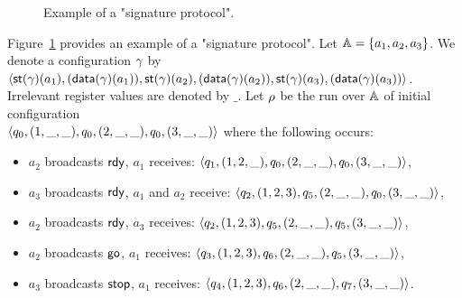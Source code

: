 \begin{figure}[t]
	\centering
	\resizebox*{!}{3.5cm}{
	
	}
	\caption{Example of a "signature protocol".}\label{fig:ex2}\label{fig:example-signature-protocol}
\end{figure}
\begin{example}
\label{ex:protocol-signature}
	Figure~\ref{fig:example-signature-protocol} provides an example of a "signature protocol".
Let $\mathbb{A} = \{a_1, a_2,a_3\}$. We denote a configuration $\gamma$ by $\langle \mathsf{st}(\gamma)(a_1),(\mathsf{data}(\gamma)(a_1)), \\ \mathsf{st}(\gamma)(a_2),(\mathsf{data}(\gamma)(a_2)), \mathsf{st}(\gamma)(a_3), (\mathsf{data}(\gamma)(a_3)) \rangle$. Irrelevant register values are denoted by $\_$. Let $\rho$ be the run over $\mathbb{A}$ of initial configuration  \\$\langle q_0, (1,\_,\_), q_0, (2,\_,\_), q_0, (3,\_,\_) \rangle$ where the following occurs:
\begin{itemize}
\item $a_2$ broadcasts $\textsf{rdy}$, $a_1$ receives: $\langle q_1, (1,2,\_), q_0, (2,\_,\_), q_0, (3,\_,\_) \rangle$,
\item $a_3$ broadcasts $\textsf{rdy}$, $a_1$ and $a_2$ receive: $\langle q_2, (1,2,3), q_5, (2,\_,\_), q_0, (3,\_,\_) \rangle$,
\item $a_2$ broadcasts $\textsf{rdy}$, $a_3$ receives: $\langle q_2, (1,2,3), q_5, (2,\_,\_), q_5, (3,\_,\_) \rangle$,
\item $a_2$ broadcasts $\textsf{go}$, $a_1$ receives: $\langle q_3, (1,2,3), q_6, (2,\_,\_), q_5, (3,\_,\_) \rangle$,
\item $a_3$ broadcasts $\textsf{stop}$, $a_1$ receives: $\langle q_4, (1,2,3), q_6, (2,\_,\_), q_7, (3,\_,\_) \rangle$.
\end{itemize}
	

\end{example}
